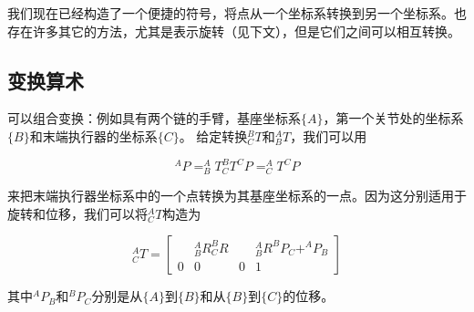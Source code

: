 
我们现在已经构造了一个便捷的符号，将点从一个坐标系转换到另一个坐标系。也存在许多其它的方法，尤其是表示旋转（见下文），但是它们之间可以相互转换。

\subsection{变换算术}

可以组合变换：例如具有两个链的手臂，基座坐标系$\{A\}$，第一个关节处的坐标系$\{B\}$和末端执行器的坐标系$\{C\}$。 给定转换$^B_CT$和$^A_BT$，我们可以用

\begin{equation}
^AP=^A_BT^B_CT^CP=^A_CT^CP
\end{equation}

来把末端执行器坐标系中的一个点转换为其基座坐标系的一点。因为这分别适用于旋转和位移，我们可以将$^A_CT$构造为

\begin{equation}
^A_CT=\left[\begin{array}{ccc|c} & ^A_BR^B_CR & & ^A_BR^BP_C +^AP_B \\\hline 0 & 0 & 0 & 1\end{array}\right]
\end{equation}
%

其中$^AP_B$和$^BP_C$分别是从$\{A\}$到$\{B\}$和从$\{B\}$到$\{C\}$的位移。

